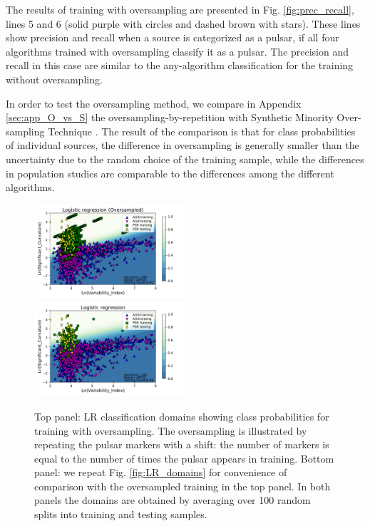 \documentclass{aa}
\begin{document}
The results of training with oversampling are presented  in Fig. \ref{fig:prec_recall},
lines 5 and 6 (solid purple with circles and dashed brown with stars). 
These lines show precision and recall when a source is categorized as a pulsar, if all four algorithms trained with oversampling classify it as a pulsar. The precision and recall in this case are similar to the any-algorithm classification for the training without oversampling.

In order to test the oversampling method, we compare in Appendix \ref{sec:app_O_vs_S} the oversampling-by-repetition with Synthetic Minority Over-sampling Technique \cite[SMOTE,][]{Chawla_2002}. The result of the comparison is that for class probabilities of individual sources, the difference in oversampling is generally smaller than the uncertainty due to the random choice of the training sample, while the differences in population studies are comparable to the differences among the different algorithms.


\begin{figure}[h]
\centering
\includegraphics[width=0.5\textwidth]{plots/classification_domains/lr_200_lbfgs_oversample.pdf} \\
\includegraphics[width=0.5\textwidth]{plots/classification_domains/lr_200_lbfgs.pdf}
\caption{Top panel: LR classification domains showing class probabilities for training with oversampling.
The oversampling is illustrated by repeating the pulsar markers with a shift: the number of markers is equal to the number of times the pulsar appears in training.
Bottom panel: we repeat Fig. \ref{fig:LR_domains} for convenience of comparison with the oversampled training in the top panel.
In both panels the domains are obtained by averaging over 100 random splits into training and testing samples.
}  
\label{fig:LR_domains_O}
\end{figure}
\end{document}
